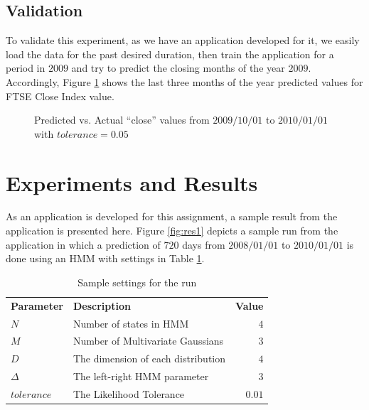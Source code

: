 \documentclass{acm_proc_article-sp}
\newcommand{\thickhline}{\noalign{\hrule height 1.0pt}}
\begin{document}
\subsection{Validation} \label{sec:valid}
To validate this experiment, as we have an application developed for it, we easily load the data for the past desired
duration, then train the application for a period in $2009$ and try to predict the closing months of the year $2009$.
Accordingly, Figure \ref{fig:validation} shows the last three months of the year predicted values for FTSE Close Index
value.

\begin{figure}[t]
\centering
\setlength\fboxsep{0.1pt}
\setlength\fboxrule{0.7pt}
\caption{Predicted vs. Actual ``close'' values from $2009/10/01$ to $2010/01/01$ with $tolerance = 0.05$}
\label{fig:validation}
\end{figure}

\section{Experiments and Results} \label{sec:results}
As an application is developed for this assignment, a sample result from the application is presented here. Figure
\ref{fig:res1} depicts a sample run from the application in which a prediction of $720$ days from $2008/01/01$ to
$2010/01/01$ is done using an HMM with settings in Table \ref{tbl:res1}.

\begin{table}[h]
\centering
\begin{tabular}{l l r}
\textbf{Parameter} & \textbf{Description} & \textbf{Value} \\ \thickhline
$N$ & Number of states in HMM & $4$ \\ \hline
$M$ & Number of Multivariate Gaussians & $3$ \\ \hline
$D$ & The dimension of each distribution & $4$ \\ \hline
$\Delta$ & The left-right HMM parameter & $3$ \\ \hline
$tolerance$ & The Likelihood Tolerance & $0.01$ \\ \hline
\end{tabular}
\caption{Sample settings for the run} \label{tbl:res1}
\end{table}
\end{document}
